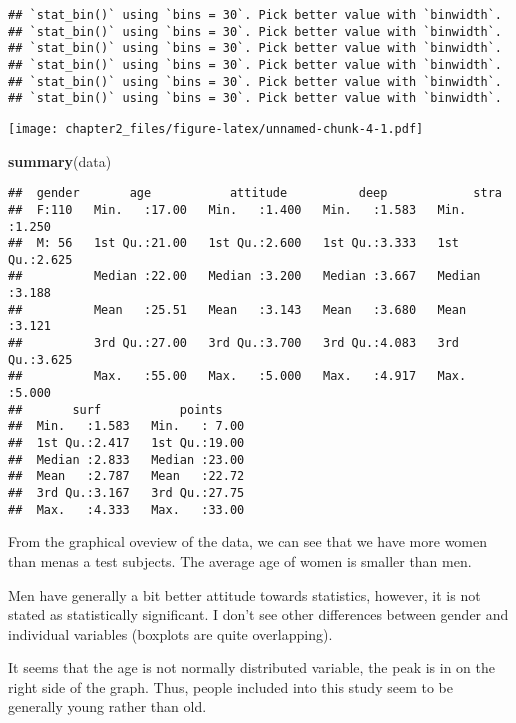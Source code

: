 \documentclass[
]{article}
\newenvironment{Shaded}{\begin{snugshade}}{\end{snugshade}}
\newcommand{\KeywordTok}[1]{\textcolor[rgb]{0.13,0.29,0.53}{\textbf{#1}}}
\newcommand{\NormalTok}[1]{#1}
\begin{document}
\begin{verbatim}
## `stat_bin()` using `bins = 30`. Pick better value with `binwidth`.
## `stat_bin()` using `bins = 30`. Pick better value with `binwidth`.
## `stat_bin()` using `bins = 30`. Pick better value with `binwidth`.
## `stat_bin()` using `bins = 30`. Pick better value with `binwidth`.
## `stat_bin()` using `bins = 30`. Pick better value with `binwidth`.
## `stat_bin()` using `bins = 30`. Pick better value with `binwidth`.
\end{verbatim}

\texttt{[image: chapter2\_files/figure-latex/unnamed-chunk-4-1.pdf]}

\begin{Shaded}
\begin{Highlighting}[]
\KeywordTok{summary}\NormalTok{(data)}
\end{Highlighting}
\end{Shaded}

\begin{verbatim}
##  gender       age           attitude          deep            stra      
##  F:110   Min.   :17.00   Min.   :1.400   Min.   :1.583   Min.   :1.250  
##  M: 56   1st Qu.:21.00   1st Qu.:2.600   1st Qu.:3.333   1st Qu.:2.625  
##          Median :22.00   Median :3.200   Median :3.667   Median :3.188  
##          Mean   :25.51   Mean   :3.143   Mean   :3.680   Mean   :3.121  
##          3rd Qu.:27.00   3rd Qu.:3.700   3rd Qu.:4.083   3rd Qu.:3.625  
##          Max.   :55.00   Max.   :5.000   Max.   :4.917   Max.   :5.000  
##       surf           points     
##  Min.   :1.583   Min.   : 7.00  
##  1st Qu.:2.417   1st Qu.:19.00  
##  Median :2.833   Median :23.00  
##  Mean   :2.787   Mean   :22.72  
##  3rd Qu.:3.167   3rd Qu.:27.75  
##  Max.   :4.333   Max.   :33.00
\end{verbatim}

From the graphical oveview of the data, we can see that we have more
women than menas a test subjects. The average age of women is smaller
than men.

Men have generally a bit better attitude towards statistics, however, it
is not stated as statistically significant. I don't see other
differences between gender and individual variables (boxplots are quite
overlapping).

It seems that the age is not normally distributed variable, the peak is
in on the right side of the graph. Thus, people included into this study
seem to be generally young rather than old.
\end{document}
